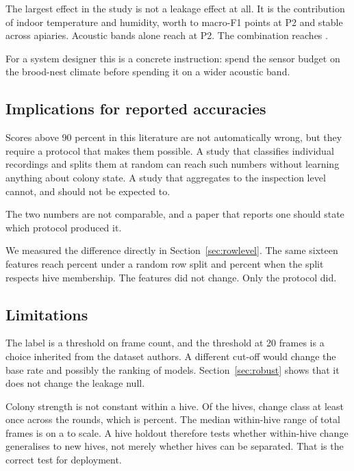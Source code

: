 ﻿\documentclass[review,12pt]{elsarticle}
\begin{document}
The largest effect in the study is not a leakage effect at all.
It is the contribution of indoor temperature and humidity, worth
\LeakEnvGainMinPts{} to \LeakEnvGainMaxPts{} macro-F1 points at P2 and stable
across apiaries.
Acoustic bands alone reach
\LeakBandsPtwoHistGradientBoostingMacroFone{} at P2.
The combination reaches \LeakBandsEnvPtwoHistGradientBoostingMacroFone{}.

For a system designer this is a concrete instruction: spend the sensor budget
on the brood-nest climate before spending it on a wider acoustic band.

\subsection{Implications for reported accuracies}

Scores above 90 percent in this literature are not automatically wrong, but
they require a protocol that makes them possible.
A study that classifies individual recordings and splits them at random can
reach such numbers without learning anything about colony state.
A study that aggregates to the inspection level cannot, and should not be
expected to.

The two numbers are not comparable, and a paper that reports one should state
which protocol produced it.

We measured the difference directly in Section~\ref{sec:rowlevel}.
The same sixteen features reach \LeakReproBestAAccuracy{} percent under a random
row split and \LeakReproBestBAccuracy{} percent when the split respects hive
membership.
The features did not change.
Only the protocol did.

\subsection{Limitations}
\label{sec:limitations}

The label is a threshold on frame count, and the threshold at 20 frames is a
choice inherited from the dataset authors.
A different cut-off would change the base rate and possibly the ranking of
models.
Section~\ref{sec:robust} shows that it does not change the leakage null.

Colony strength is not constant within a hive.
Of the \LeakNHives{} hives, \LeakNFlipHives{} change class at least once across
the \LeakNRounds{} rounds, which is \LeakFlipPct{} percent.
The median within-hive range of total frames is \LeakMedianWithinRange{} on a
\LeakFramesMin{} to \LeakFramesMax{} scale.
A hive holdout therefore tests whether within-hive change generalises to new
hives, not merely whether hives can be separated.
That is the correct test for deployment.
\end{document}
